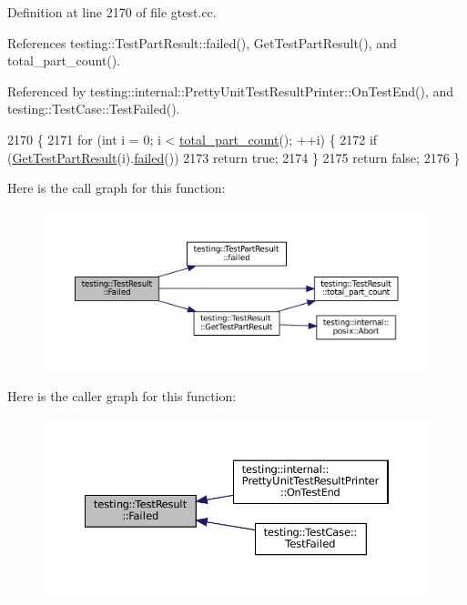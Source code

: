 Definition at line 2170 of file gtest.\+cc.



References testing\+::\+Test\+Part\+Result\+::failed(), Get\+Test\+Part\+Result(), and total\+\_\+part\+\_\+count().



Referenced by testing\+::internal\+::\+Pretty\+Unit\+Test\+Result\+Printer\+::\+On\+Test\+End(), and testing\+::\+Test\+Case\+::\+Test\+Failed().


\begin{DoxyCode}
2170                               \{
2171   \textcolor{keywordflow}{for} (\textcolor{keywordtype}{int} i = 0; i < \hyperlink{classtesting_1_1TestResult_a6174aa4019dcda7c34d776b5741c9032}{total\_part\_count}(); ++i) \{
2172     \textcolor{keywordflow}{if} (\hyperlink{classtesting_1_1TestResult_a765c1e734ac08115757b343d57226bba}{GetTestPartResult}(i).\hyperlink{classtesting_1_1TestPartResult_aa04b377c3e7ed57d39e882df5561ac90}{failed}())
2173       \textcolor{keywordflow}{return} \textcolor{keyword}{true};
2174   \}
2175   \textcolor{keywordflow}{return} \textcolor{keyword}{false};
2176 \}
\end{DoxyCode}
Here is the call graph for this function\+:
\nopagebreak
\begin{figure}[H]
\begin{center}
\leavevmode
\includegraphics[width=350pt]{classtesting_1_1TestResult_afacc37e8b43c8574e4101bc61723c769_cgraph}
\end{center}
\end{figure}
Here is the caller graph for this function\+:
\nopagebreak
\begin{figure}[H]
\begin{center}
\leavevmode
\includegraphics[width=350pt]{classtesting_1_1TestResult_afacc37e8b43c8574e4101bc61723c769_icgraph}
\end{center}
\end{figure}
